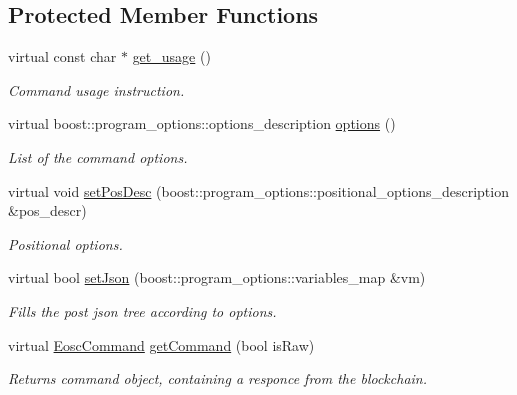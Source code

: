 \subsection*{Protected Member Functions}
\begin{DoxyCompactItemize}
\item 
virtual const char $\ast$ \hyperlink{classtokenika_1_1eosc_1_1_command_options_a28fb680d7477e19e523367d2585655fb}{get\+\_\+usage} ()
\begin{DoxyCompactList}\small\item\em Command \textquotesingle{}usage\textquotesingle{} instruction. \end{DoxyCompactList}\item 
virtual boost\+::program\+\_\+options\+::options\+\_\+description \hyperlink{classtokenika_1_1eosc_1_1_command_options_aa55960f380250eb7065cb6489b67196f}{options} ()
\begin{DoxyCompactList}\small\item\em List of the command options. \end{DoxyCompactList}\item 
virtual void \hyperlink{classtokenika_1_1eosc_1_1_command_options_ae2e98c683ae1eb3e5af1e81e60020447}{set\+Pos\+Desc} (boost\+::program\+\_\+options\+::positional\+\_\+options\+\_\+description \&pos\+\_\+descr)
\begin{DoxyCompactList}\small\item\em Positional options. \end{DoxyCompactList}\item 
virtual bool \hyperlink{classtokenika_1_1eosc_1_1_command_options_a7aecc9aa79ca65f6abbd568ff8ff77a7}{set\+Json} (boost\+::program\+\_\+options\+::variables\+\_\+map \&vm)
\begin{DoxyCompactList}\small\item\em Fills the post json tree according to options. \end{DoxyCompactList}\item 
virtual \hyperlink{classtokenika_1_1eosc_1_1_eosc_command}{Eosc\+Command} \hyperlink{classtokenika_1_1eosc_1_1_command_options_a787f15164e2055394d9d948c07bf201c}{get\+Command} (bool is\+Raw)
\begin{DoxyCompactList}\small\item\em Returns command object, containing a responce from the blockchain. \end{DoxyCompactList}\item 
\mbox{\label{classtokenika_1_1eosc_1_1_command_options_ab1fe134b6c2230257a5c07b021812986}} 

\end{DoxyCompactItemize}
